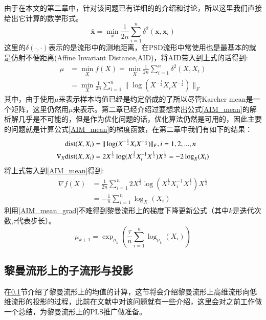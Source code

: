 由于在本文的第二章中，针对该问题已有详细的的介绍和讨论，所以这里我们直接给出它计算的数学形式。
\begin{displaymath}
\bar{\bm{x}}=\min_x\frac{1}{2n}\sum_{i=1}^{n}\delta^{2}(\bm{x},\bm{x}_i)
\end{displaymath}
这里的$\delta(\cdot,\cdot)$表示的是流形中的测地距离，在PSD流形中常使用也是最基本的就是仿射不便距离(Affine Invariant Distance,AID)\cite{AIM_metric}，将AID带入到上式的话得到:
\begin{equation}
\label{AIM_mean}
\begin{split}
\mu&=\min_{X}f(X)=\min_{X}\frac{1}{2n}\sum_{i=1}^{n}\delta^{2}(X,X_i)\\
&=\min_{X}\frac{1}{2n}\sum_{i=1}^{n}\|\log(X^{-\frac{1}{2}}X_iX^{-\frac{1}{2}})\|_F
\end{split}
\end{equation}
其中，由于使用$\mu$来表示样本均值已经是约定俗成的了所以尽管Karcher mean是一个矩阵，这里仍然用$\mu$来表示。第二章已经介绍过要想求出公式\ref{AIM_mean}的解析解几乎是不可能的，但是作为优化问题的话，优化算法仍然是可用的，因此主要的问题就是计算公式\ref{AIM_mean}的梯度函数，在第二章中我们有如下的结果：
\begin{equation}
\label{AIM_grad}
\begin{split}
{\rm dist}(X,X_i)&=\|\log(X^{-\frac{1}{2}} X_i X^{-\frac{1}{2}})\|_{F},i=1,2,...,n\\
\nabla_X {\rm dist}(X,X_i)&=2X^{\frac{1}{2}}\log(X^{\frac{1}{2}}X_{i}^{-1}X^{\frac{1}{2}})X^{\frac{1}{2}}=-2\log_{X}(X_i)
\end{split}
\end{equation}
将上式带入到\ref{AIM_mean}得到:
\begin{equation}
\label{AIM_mean_grad}
\begin{split}
\nabla f(X)&=\frac{1}{2n}\sum_{i=1}^{n}2X^{\frac{1}{2}}\log(X^{\frac{1}{2}}X_{i}^{-1}X^{\frac{1}{2}})X^{\frac{1}{2}}\\
&=-\frac{1}{n}\sum_{i=1}^{n}\log_{X}(X_i)
\end{split}
\end{equation}
利用\ref{AIM_mean_grad}不难得到黎曼流形上的梯度下降更新公式（其中$k$是迭代次数,$\tau$代表步长）。
\begin{equation}
\label{AIM_grad_update}
\mu_{k+1}=\exp_{\mu_k}(\frac{\tau}{n}\sum_{i=1}^{n}\log_{\mu_k}(X_i))
\end{equation}
\subsection{黎曼流形上的子流形与投影}
\label{sec:riemannian_mean}
在\ref{sec:riemannian_mean}节介绍了黎曼流形上的均值的计算，这节将会介绍黎曼流形上高维流形向低维流形的投影的过程，此前在文献\cite{PGA,RCCA}中对该问题就有一些介绍，这里会对之前工作做一个总结，为黎曼流形上的PLS推广做准备。

